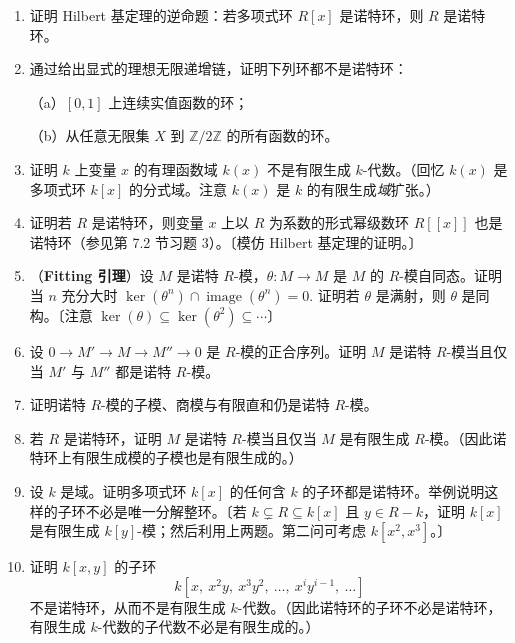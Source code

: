 \begin{enumerate}
\item 证明 Hilbert 基定理的逆命题：若多项式环 \(R[x]\) 是诺特环，则 \(R\) 是诺特环。

\item 通过给出显式的理想无限递增链，证明下列环都不是诺特环：

（a）\([0,1]\) 上连续实值函数的环；

（b）从任意无限集 \(X\) 到 \(\mathbb{Z}/2\mathbb{Z}\) 的所有函数的环。

\item 证明 \(k\) 上变量 \(x\) 的有理函数域 \(k(x)\) 不是有限生成 \(k\)-代数。（回忆 \(k(x)\) 是多项式环 \(k[x]\) 的分式域。注意 \(k(x)\) 是 \(k\) 的有限生成\emph{域}扩张。）

\item 证明若 \(R\) 是诺特环，则变量 \(x\) 上以 \(R\) 为系数的形式幂级数环 \(R[[x]]\) 也是诺特环（参见第 7.2 节习题 3）。〔模仿 Hilbert 基定理的证明。〕

\item （\textbf{Fitting 引理}）设 \(M\) 是诺特 \(R\)-模，\(\theta : M \to M\) 是 \(M\) 的 \(R\)-模自同态。证明当 \(n\) 充分大时 \(\ker(\theta^n) \cap \operatorname{image}(\theta^n) = 0\). 证明若 \(\theta\) 是满射，则 \(\theta\) 是同构。〔注意 \(\ker(\theta) \subseteq \ker(\theta^2) \subseteq \cdots\)〕

\item 设 \(0 \to M' \to M \to M'' \to 0\) 是 \(R\)-模的正合序列。证明 \(M\) 是诺特 \(R\)-模当且仅当 \(M'\) 与 \(M''\) 都是诺特 \(R\)-模。

\item 证明诺特 \(R\)-模的子模、商模与有限直和仍是诺特 \(R\)-模。

\item 若 \(R\) 是诺特环，证明 \(M\) 是诺特 \(R\)-模当且仅当 \(M\) 是有限生成 \(R\)-模。（因此诺特环上有限生成模的子模也是有限生成的。）

\item 设 \(k\) 是域。证明多项式环 \(k[x]\) 的任何含 \(k\) 的子环都是诺特环。举例说明这样的子环不必是唯一分解整环。〔若 \(k \subsetneq R \subseteq k[x]\) 且 \(y \in R-k\)，证明 \(k[x]\) 是有限生成 \(k[y]\)-模；然后利用上两题。第二问可考虑 \(k[x^2,x^3]\)。〕

\item 证明 \(k[x,y]\) 的子环
\[
k[x,\ x^2y,\ x^3y^2,\ \ldots,\ x^iy^{i-1},\ \ldots]
\]
不是诺特环，从而不是有限生成 \(k\)-代数。（因此诺特环的子环不必是诺特环，有限生成 \(k\)-代数的子代数不必是有限生成的。）


\end{enumerate}
